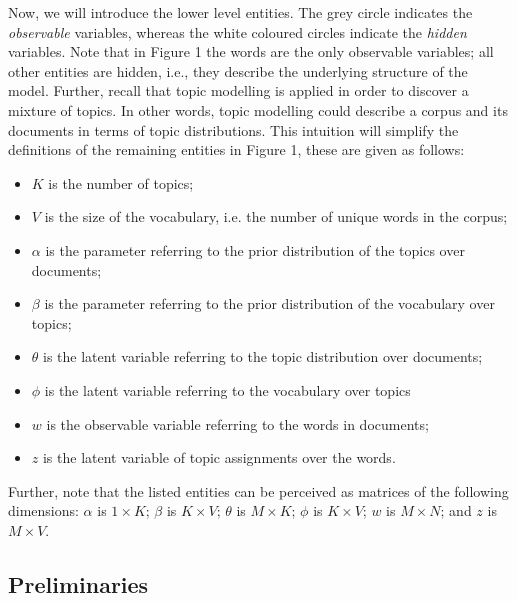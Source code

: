 \documentclass{mprop}
\begin{document}
\par Now, we will introduce the lower level entities. The grey circle indicates the \textit{observable} variables, whereas the white coloured circles indicate the \textit{hidden} variables. Note that in Figure 1 the words are the only observable variables; all other entities are hidden, i.e., they describe the underlying structure of the model. Further, recall that topic modelling is applied in order to discover a mixture of topics. In other words, topic modelling could describe a corpus and its documents in terms of topic distributions. This intuition will simplify the definitions of the remaining entities in Figure 1, these are given as follows:
\begin{itemize}
\item $K$ is the number of topics;
\item $V$ is the size of the vocabulary, i.e. the number of unique words in the corpus;
\item $\alpha$ is the parameter referring to the prior distribution of the topics over documents;
\item $\beta$ is the parameter referring to the prior distribution of the vocabulary over topics;
\item $\theta$ is the latent variable referring to the topic distribution over documents;
\item $\phi$ is the latent variable referring to the vocabulary over topics
\item $w$ is the observable variable referring to the words in documents;
\item $z$ is the latent variable of topic assignments over the words.
\end{itemize}
Further, note that the listed entities can be perceived as matrices of the following dimensions: $\alpha$ is $1 \times K$; $\beta$ is $K \times V$; $\theta$ is $M \times K$; $\phi$ is $K \times V$; $w$ is $M \times N$; and $z$ is $M \times V$.

\subsection{Preliminaries}
\end{document}
